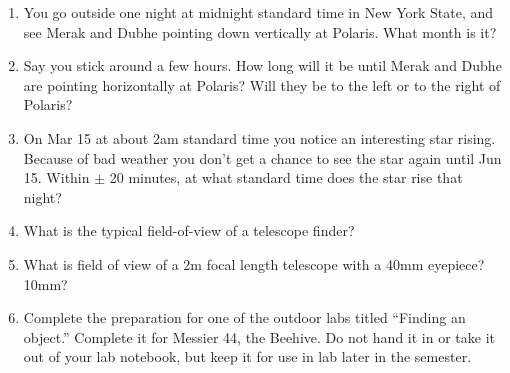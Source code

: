 
\begin{enumerate}
\item You go outside one night at midnight standard time in New York
  State, and see Merak and Dubhe pointing down vertically at
  Polaris. What month is it? 
\vspace{80pt}
\item Say you stick around a few hours.  How long will it be until
  Merak and Dubhe are pointing horizontally at Polaris?  Will they be
  to the left or to the right of Polaris?
\vspace{80pt}
\item On Mar 15 at about 2am standard time you notice an interesting
  star rising.  Because of bad weather you don’t get a chance to see
  the star again until Jun 15.  Within $\pm$ 20 minutes, at what
  standard time does the star rise that night?
\vspace{80pt}
\item What is the typical field-of-view of a telescope finder?
\vspace{80pt}
\item What is field of view of a 2m focal length telescope with a 40mm
  eyepiece? 10mm?
\vspace{80pt}
\item Complete the preparation for one of the outdoor labs titled
  ``Finding an object.'' Complete it for Messier 44, the Beehive. Do
  not hand it in or take it out of your lab notebook, but keep it for
  use in lab later in the semester.
\end{enumerate}
